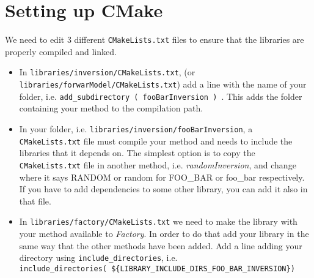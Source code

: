 \documentclass{article}
\begin{document}
\section{Setting up CMake}
We need to edit 3 different \texttt{CMakeLists.txt} files to ensure that the libraries are properly compiled and linked.
\begin{itemize}
    \item In \texttt{libraries/inversion/CMakeLists.txt}, (or \texttt{libraries/forwarModel/CMakeLists.txt}) add a line with the name of your folder, i.e. \texttt{add\_subdirectory ( fooBarInversion ) }. This adds the folder containing your method to the compilation path.
    \item In your folder, i.e. \texttt{libraries/inversion/fooBarInversion}, a \texttt{CMakeLists.txt} file must compile your method and needs to include the libraries that it depends on. The simplest option is to copy the \texttt{CMakeLists.txt} file in another method, i.e. \textit{randomInversion}, and change where it says RANDOM or random for FOO\_BAR or foo\_bar respectively. If you have to add dependencies to some other library, you can add it also in that file.
    \item In \texttt{libraries/factory/CMakeLists.txt} we need to make the library with your method available to \textit{Factory}. In order to do that add your library in the same way that the other methods have been added. Add a line adding your directory using \texttt{include\_directories}, i.e.\\\texttt{include\_directories( \$\{LIBRARY\_INCLUDE\_DIRS\_FOO\_BAR\_INVERSION\})}
\end{itemize}
\end{document}
